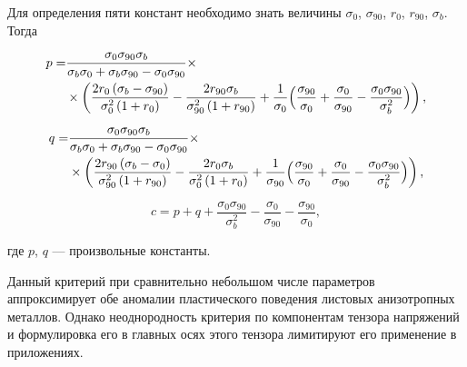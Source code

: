 Для определения пяти констант необходимо знать величины $\sigma_0$, $\sigma_{90}$, $r_0$, $r_{90}$, $\sigma_b.$ Тогда

\begin{equation}

\begin{split}

p = &\frac{\sigma_0 \sigma_{90} \sigma_b}{\sigma_b \sigma_0 + \sigma_b \sigma_{90} - \sigma_0 \sigma_{90}}\times \\

&\times\left( \frac{2r_0 \left( \sigma_b - \sigma_{90} \right)}{\sigma_0^2 \left( 1 + r_0 \right)} - \frac{2r_{90} \sigma_b}{\sigma_{90}^2 \left( 1 + r_{90} \right)} +\frac{1}{\sigma_0} 

\Bigl( \frac{\sigma_{90}}{\sigma_0} + \frac{\sigma_0}{\sigma_{90}} - \frac{\sigma_0 \sigma_{90}}{\sigma_b^2} \Bigr) \right),

\end{split}	

\end{equation}

\begin{equation}

\begin{split}

q = &\frac{\sigma_0 \sigma_{90} \sigma_b}{\sigma_b \sigma_0 + \sigma_b \sigma_{90} - \sigma_0 \sigma_{90}}\times\\

&\times\left( \frac{2r_{90} \left( \sigma_b - \sigma_{0} \right)}{\sigma_{90}^2 \left( 1 + r_{90} \right)} - \frac{2r_{0} \sigma_b}{\sigma_{0}^2 \left( 1 + r_{0} \right)} + \frac{1}{\sigma_{90}}

\Bigl( \frac{\sigma_{90}}{\sigma_0} + \frac{\sigma_0}{\sigma_{90}} - \frac{\sigma_0 \sigma_{90}}{\sigma_b^2} \Bigr) \right),

\end{split}	

\end{equation}

\begin{equation}

	c = p + q + \frac{\sigma_0 \sigma_{90}}{\sigma_b^2} - \frac{\sigma_0}{\sigma_{90}} - \frac{\sigma_{90}}{\sigma_0},

\end{equation}

где $p$, $q$ --- произвольные константы.



Данный критерий при сравнительно небольшом числе параметров аппроксимирует обе аномалии пластического поведения листовых анизотропных металлов. Однако неоднородность критерия по компонентам тензора напряжений и формулировка его в главных осях этого тензора лимитируют его применение в приложениях.



